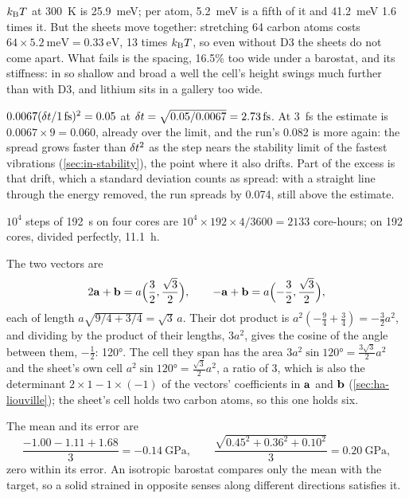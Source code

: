 $k_{\mathrm{B}} T$ at \SI{300}{\kelvin} is
\SI{25.9}{\milli\electronvolt}; per atom, \SI{5.2}{\milli\electronvolt}
is a fifth of it and \SI{41.2}{\milli\electronvolt} 1.6 times it. But the
sheets move together: stretching 64 carbon atoms costs $64\times
\SI{5.2}{\milli\electronvolt} = \SI{0.33}{\electronvolt}$, 13 times $k_{\mathrm{B}}
T$, so even without D3 the sheets do not come apart. What fails is the
spacing, 16.5\% too wide under a barostat, and its stiffness: in so
shallow and broad a well the cell's height swings much further than with
D3, and lithium sits in a gallery too wide.

$0.0067(\dt/\SI{1}{\femto\second})^2 = 0.05$ at
$\dt = \sqrt{0.05/0.0067} = \SI{2.73}{\femto\second}$. At
\SI{3}{\femto\second} the estimate is $0.0067\times9 = 0.060$, already over
the limit, and the run's 0.082 is more again: the spread grows faster than
$\delta t^2$ as the step nears the stability limit of the fastest vibrations
(\cref{sec:in-stability}), the point where it also drifts. Part of the
excess is that drift, which a standard deviation counts as spread: with a
straight line through the energy removed, the run spreads by 0.074, still
above the estimate.

$10^4$ steps of \SI{192}{\second} on four cores
are $10^4\times192\times4/3600 = 2133$ core-hours; on 192 cores, divided
perfectly, \SI{11.1}{\hour}.

The two vectors are
\begin{equation*}
   2\bm{\mathrm{a}} + \bm{\mathrm{b}} = a\Bigl(\frac32, \frac{\sqrt3}{2}\Bigr), \qquad
   -\bm{\mathrm{a}} + \bm{\mathrm{b}} = a\Bigl(-\frac32, \frac{\sqrt3}{2}\Bigr),
\end{equation*}
each of length $a\sqrt{9/4 + 3/4} = \sqrt3\,a$. Their dot product is
$a^2(-\frac94 + \frac34) = -\frac32a^2$, and dividing by the product of
their lengths, $3a^2$, gives the cosine of the angle between them,
$-\frac12$: \ang{120}. The cell they span has the area $3a^2\sin\ang{120}
= \frac{3\sqrt3}{2}a^2$ and the sheet's own cell $a^2\sin\ang{120} =
\frac{\sqrt3}{2}a^2$, a ratio of 3, which is also the determinant
$2\times1 - 1\times(-1)$ of the vectors' coefficients in $\bm{\mathrm{a}}$ and
$\bm{\mathrm{b}}$ (\cref{sec:ha-liouville}); the sheet's cell holds two carbon
atoms, so this one holds six.

The mean and its error are
\begin{equation*}
   \frac{-1.00 - 1.11 + 1.68}{3} = \SI{-0.14}{\giga\pascal}, \qquad
   \frac{\sqrt{0.45^2 + 0.36^2 + 0.10^2}}{3} = \SI{0.20}{\giga\pascal},
\end{equation*}
zero within its error. An isotropic barostat compares only the mean
with the target, so a solid strained in opposite senses along different
directions satisfies it.

